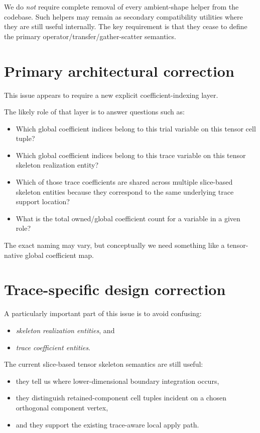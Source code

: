 \documentclass[11pt]{article}
\begin{document}
We do \emph{not} require complete removal of every ambient-shape helper from the codebase.  Such helpers may remain as secondary compatibility utilities where they are still useful internally.  The key requirement is that they cease to define the primary operator/transfer/gather-scatter semantics.

\section{Primary architectural correction}

This issue appears to require a new explicit coefficient-indexing layer.

The likely role of that layer is to answer questions such as:
\begin{itemize}[leftmargin=2em]
\item Which global coefficient indices belong to this trial variable on this tensor cell tuple?
\item Which global coefficient indices belong to this trace variable on this tensor skeleton realization entity?
\item Which of those trace coefficients are shared across multiple slice-based skeleton entities because they correspond to the same underlying trace support location?
\item What is the total owned/global coefficient count for a variable in a given role?
\end{itemize}

The exact naming may vary, but conceptually we need something like a tensor-native global coefficient map.

\section{Trace-specific design correction}

A particularly important part of this issue is to avoid confusing:
\begin{itemize}[leftmargin=2em]
\item \emph{skeleton realization entities}, and
\item \emph{trace coefficient entities}.
\end{itemize}

The current slice-based tensor skeleton semantics are still useful:
\begin{itemize}[leftmargin=2em]
\item they tell us where lower-dimensional boundary integration occurs,
\item they distinguish retained-component cell tuples incident on a chosen orthogonal component vertex,
\item and they support the existing trace-aware local apply path.
\end{itemize}
\end{document}
